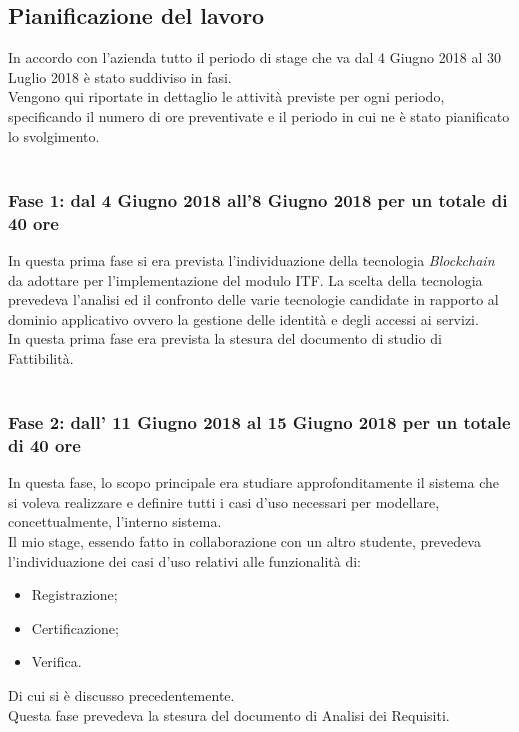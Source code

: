 \subsection{Pianificazione del lavoro}
\label{sec:pianificazione_del_lavoro}
In accordo con l'azienda tutto il periodo di stage che va dal 4 Giugno 2018 al 30 Luglio 2018 è stato suddiviso in fasi.\\
Vengono qui riportate in dettaglio le attività previste per ogni periodo, specificando il numero di ore preventivate e il periodo in cui ne è stato pianificato lo svolgimento.\\\\
\subsubsection{Fase 1: dal 4 Giugno 2018 all'8 Giugno 2018 per un totale di 40 ore}
In questa prima fase si era prevista l'individuazione della tecnologia \textit{Blockchain} da adottare per l'implementazione del modulo \gls{ITF}. La scelta della tecnologia prevedeva l'analisi ed il confronto delle varie tecnologie candidate in rapporto al dominio applicativo ovvero la gestione delle identità e degli accessi ai servizi.\\
In questa prima fase era prevista la stesura del documento di studio di Fattibilità.\\\\

\subsubsection{Fase 2: dall' 11 Giugno 2018 al 15 Giugno 2018 per un totale di 40 ore}
In questa fase, lo scopo principale era studiare approfonditamente il sistema che si voleva realizzare e definire tutti i casi d'uso necessari per modellare, concettualmente, l'interno sistema.\\
Il mio stage, essendo fatto in collaborazione con un altro studente, prevedeva l'individuazione dei casi d'uso relativi alle funzionalità di:
\begin{itemize}
	\item Registrazione;
	\item Certificazione;
	\item Verifica.
\end{itemize}
Di cui si è discusso precedentemente.\\
Questa fase prevedeva la stesura del documento di Analisi dei Requisiti.\\\\

